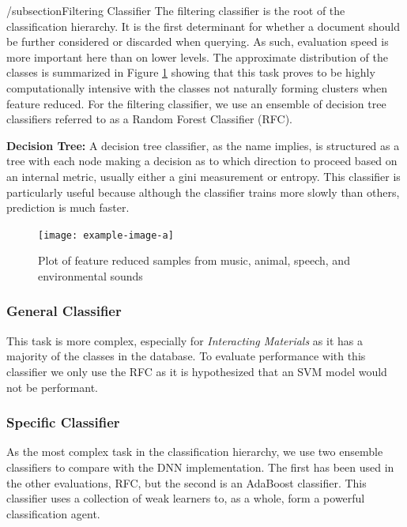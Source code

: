 /subsection{Filtering Classifier}
The filtering classifier is the root of the classification hierarchy. It is the
first determinant for whether a document should be further considered or discarded when querying. As such, evaluation speed is more important here than on lower levels. The approximate distribution of the classes is summarized in Figure \ref{fig:top-dist} showing that this task proves to be highly computationally intensive with the classes not naturally forming clusters when feature reduced. For the filtering classifier, we use an ensemble of decision tree classifiers referred to as a Random Forest Classifier (RFC).

\textbf{Decision Tree: } A decision tree classifier, as the name implies, is structured as a tree with each node making a decision as to which direction to proceed based on an internal metric, usually either a gini measurement or entropy. This classifier is particularly useful because although the classifier trains more slowly than others, prediction is much faster.

\begin{figure}
    \centering
    \texttt{[image: example-image-a]}
    \caption{Plot of feature reduced samples from music, animal, speech, and environmental sounds}
    \label{fig:top-dist}
\end{figure}

\subsubsection{General Classifier}
This task is more complex, especially for \textit{Interacting Materials} as it
has a majority of the classes in the database. To evaluate performance with this
classifier we only use the RFC as it is hypothesized that an SVM model would not
be performant.

\subsubsection{Specific Classifier}
As the most complex task in the classification hierarchy, we use two ensemble
classifiers to compare with the DNN implementation. The first has been used in
the other evaluations, RFC, but the second is an AdaBoost classifier. This
classifier uses a collection of weak learners to, as a whole, form a powerful
classification agent.
